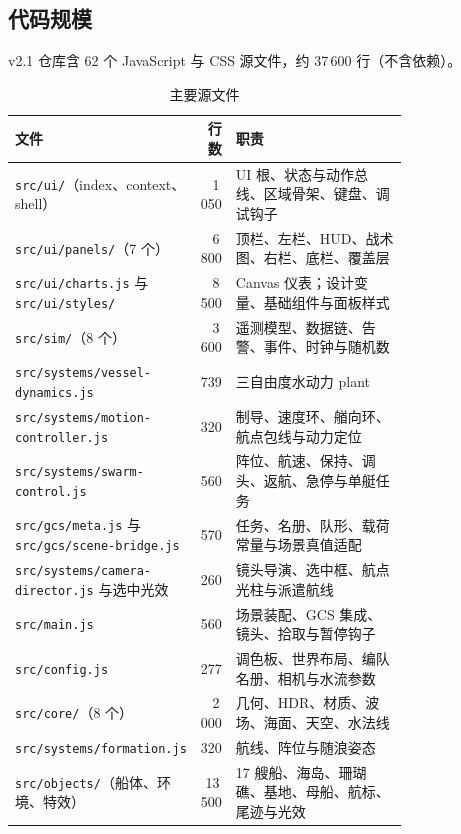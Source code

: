\documentclass[UTF8, a4paper, 11pt]{ctexart}
\newcommand{\file}[1]{\texttt{#1}}
\begin{document}
\subsection{代码规模}

v2.1 仓库含 62 个 JavaScript 与 CSS 源文件，约 37\,600 行（不含依赖）。

\begin{table}[H]
\centering
\caption{主要源文件}
\label{tab:files}
\footnotesize
\begin{tabular}{@{}p{0.34\linewidth}r p{0.44\linewidth}@{}}
\toprule
\textbf{文件} & \textbf{行数} & \textbf{职责} \\
\midrule
\file{src/ui/}（index、context、shell） & 1\,050 & UI 根、状态与动作总线、区域骨架、键盘、调试钩子 \\
\file{src/ui/panels/}（7 个） & 6\,800 & 顶栏、左栏、HUD、战术图、右栏、底栏、覆盖层 \\
\file{src/ui/charts.js} 与 \file{src/ui/styles/} & 8\,500 & Canvas 仪表；设计变量、基础组件与面板样式 \\
\file{src/sim/}（8 个） & 3\,600 & 遥测模型、数据链、告警、事件、时钟与随机数 \\
\file{src/systems/vessel-dynamics.js} & 739 & 三自由度水动力 plant \\
\file{src/systems/motion-controller.js} & 320 & 制导、速度环、艏向环、航点包线与动力定位 \\
\file{src/systems/swarm-control.js} & 560 & 阵位、航速、保持、调头、返航、急停与单艇任务 \\
\file{src/gcs/meta.js} 与 \file{src/gcs/scene-bridge.js} & 570 & 任务、名册、队形、载荷常量与场景真值适配 \\
\file{src/systems/camera-director.js} 与选中光效 & 260 & 镜头导演、选中框、航点光柱与派遣航线 \\
\file{src/main.js} & 560 & 场景装配、GCS 集成、镜头、拾取与暂停钩子 \\
\file{src/config.js} & 277 & 调色板、世界布局、编队名册、相机与水流参数 \\
\file{src/core/}（8 个） & 2\,000 & 几何、HDR、材质、波场、海面、天空、水法线 \\
\file{src/systems/formation.js} & 320 & 航线、阵位与随浪姿态 \\
\file{src/objects/}（船体、环境、特效） & 13\,500 & 17 艘船、海岛、珊瑚礁、基地、母船、航标、尾迹与光效 \\
\bottomrule
\end{tabular}
\end{table}
\end{document}
